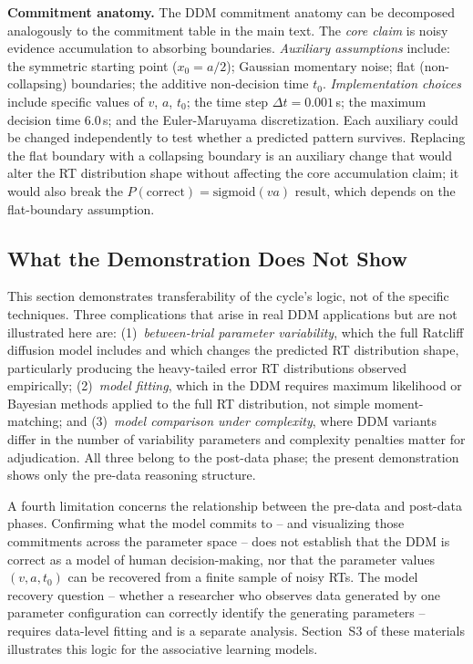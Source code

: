 \documentclass[11pt,a4paper]{article}
\begin{document}
\textbf{Commitment anatomy.} The DDM commitment anatomy can be decomposed analogously to the commitment table in the main text. The \emph{core claim} is noisy evidence accumulation to absorbing boundaries. \emph{Auxiliary assumptions} include: the symmetric starting point ($x_0 = a/2$); Gaussian momentary noise; flat (non-collapsing) boundaries; the additive non-decision time $t_0$. \emph{Implementation choices} include specific values of $v$, $a$, $t_0$; the time step $\Delta t = 0.001$\,s; the maximum decision time $6.0$\,s; and the Euler-Maruyama discretization. Each auxiliary could be changed independently to test whether a predicted pattern survives. Replacing the flat boundary with a collapsing boundary is an auxiliary change that would alter the RT distribution shape without affecting the core accumulation claim; it would also break the $P(\text{correct}) = \text{sigmoid}(va)$ result, which depends on the flat-boundary assumption.

\subsection*{What the Demonstration Does Not Show}

This section demonstrates transferability of the cycle's logic, not of the specific techniques. Three complications that arise in real DDM applications but are not illustrated here are: (1)~\emph{between-trial parameter variability}, which the full Ratcliff diffusion model includes and which changes the predicted RT distribution shape, particularly producing the heavy-tailed error RT distributions observed empirically; (2)~\emph{model fitting}, which in the DDM requires maximum likelihood or Bayesian methods applied to the full RT distribution, not simple moment-matching; and (3)~\emph{model comparison under complexity}, where DDM variants differ in the number of variability parameters and complexity penalties matter for adjudication. All three belong to the post-data phase; the present demonstration shows only the pre-data reasoning structure.

A fourth limitation concerns the relationship between the pre-data and post-data phases. Confirming what the model commits to -- and visualizing those commitments across the parameter space -- does not establish that the DDM is correct as a model of human decision-making, nor that the parameter values $(v, a, t_0)$ can be recovered from a finite sample of noisy RTs. The model recovery question -- whether a researcher who observes data generated by one parameter configuration can correctly identify the generating parameters -- requires data-level fitting and is a separate analysis. Section~S3 of these materials illustrates this logic for the associative learning models.
\end{document}
